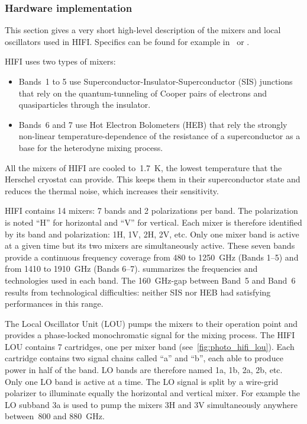 \subsubsection{Hardware implementation}

This section gives a very short high-level description of the mixers and local oscillators used in HIFI.
Specifics can be found for example in~\textcites{pearson2000local}{pearson2003terahertz}{jackson2006low} or \textcite{kooi2008}.

\noindent\begin{minipage}{\linewidth}
HIFI uses two types of mixers:
\begin{itemize}[noitemsep,nolistsep]
    \item Bands~1 to 5 use
Superconductor-Insulator-Superconductor (SIS) junctions that rely on the quantum-tunneling of Cooper pairs of electrons and quasiparticles through the insulator.
    \item Bands~6 and 7 use  Hot Electron Bolometers (HEB) that rely the strongly non-linear temperature-dependence of the resistance of a superconductor as a base for the heterodyne mixing process.
\end{itemize}
\end{minipage}

All the mixers of HIFI are cooled to~\SI{1.7}{\kelvin}, the lowest temperature that the Herschel cryostat can provide.
This keeps them in their superconductor state and reduces the thermal noise, which increases their sensitivity.

HIFI contains 14 mixers: 7 bands and 2 polarizations per band.
The polarization is noted ``H'' for horizontal and ``V'' for vertical.
Each mixer is therefore identified by its band and polarization: 1H, 1V, 2H, 2V, etc.
Only one mixer band is active at a given time but its two mixers are simultaneously active.
These seven bands provide a continuous frequency coverage from \num{480} to \SI{1250}{\giga\hertz} (Bands 1--5) and from \num{1410} to \SI{1910}{\giga\hertz} (Bands 6--7).
 summarizes the frequencies and technologies used in each band.
The \SI{160}{\giga\hertz}-gap between Band~5 and Band~6 results from technological difficulties: neither SIS nor HEB had satisfying performances in this range.

The Local Oscillator Unit (LOU) pumps the mixers to their operation point and provides a phase-locked monochromatic signal for the mixing process.
The HIFI LOU contains 7 cartridges, one per mixer band (see~\cref{fig:photo_hifi_lou}).
Each cartridge contains two signal chains called ``a'' and ``b'', each able to produce power in half of the band.
LO bands are therefore named 1a, 1b, 2a, 2b, etc.
Only one LO band is active at a time.
The LO signal is split by a wire-grid polarizer to illuminate equally the horizontal and vertical mixer.
For example the LO subband 3a is used to pump the mixers 3H and 3V simultaneously anywhere between~\num{800} and \SI{880}{\giga\hertz}.


